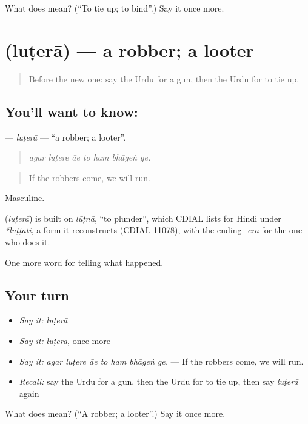 \begin{tcolorbox}[breakable,colback=teal!4,colframe=teal!35!black,title={Before you move on}]
What does  mean? (\textquotedblleft{}To tie up; to bind\textquotedblright{}.) Say it once more.
\end{tcolorbox}
\section[\texorpdfstring{\ur{لٹیرا} (luṭerā)}{لٹیرا (luṭerā)}]{ (luṭerā) — a robber; a looter}

\label{lesson:UR-C280-lutera}



\begin{quote}
Before the new one: say the Urdu for a gun, then the Urdu for to tie up.
\end{quote}

\subsection*{You'll want to know: }
\textbf{} — \emph{luṭerā} — \textquotedblleft{}a robber; a looter\textquotedblright{}.

\begin{quote}
      
\end{quote}

\begin{quote}
\emph{agar luṭere āe to ham bhāgeṅ ge.}
\end{quote}

\begin{quote}
If the robbers come, we will run.
\end{quote}

Masculine.

\begin{cousinweb}
\textbf{} (\emph{luṭerā}) is built on \emph{lūṭnā}, \textquotedblleft{}to plunder\textquotedblright{}, which CDIAL lists for Hindi under \emph{*luṭṭati}, a form it reconstructs (CDIAL 11078), with the ending \emph{-erā} for the one who does it.
\end{cousinweb}

\begin{grammarlens}[title={What you've built}]
One more word for telling what happened.
\end{grammarlens}

\subsection*{Your turn}
\begin{itemize}
\raggedright
  \item \emph{Say it:} \emph{luṭerā}
  \item \emph{Say it:} \emph{luṭerā}, once more
  \item \emph{Say it:} \emph{agar luṭere āe to ham bhāgeṅ ge.} — If the robbers come, we will run.
  \item \emph{Recall:} say the Urdu for a gun, then the Urdu for to tie up, then say \emph{luṭerā} again
\end{itemize}

\begin{tcolorbox}[breakable,colback=teal!4,colframe=teal!35!black,title={Before you move on}]
What does  mean? (\textquotedblleft{}A robber; a looter\textquotedblright{}.) Say it once more.
\end{tcolorbox}
